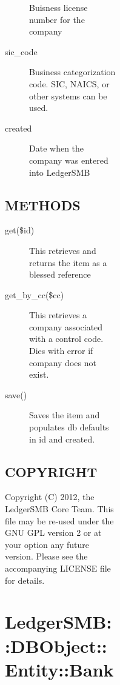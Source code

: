 \begin{description}
\begin{description}
\begin{description}
\begin{description}
\begin{description}
\begin{description}
\begin{description}
\begin{description}
\begin{description}
Buisness license number for the company


\item[{sic\_code}] \mbox{}

Business categorization code.  SIC, NAICS, or other systems can be used.


\item[{created}] \mbox{}

Date when the company was entered into LedgerSMB

\end{description}
\subsection*{METHODS\label{LedgerSMB::DBObject::Entity::Company_-_-_Company_business_handling_for_LedgerSMB_METHODS}}
\begin{description}

\item[{get(\$id)}] \mbox{}

This retrieves and returns the item as a blessed reference


\item[{get\_by\_cc(\$cc)}] \mbox{}

This retrieves a company associated with a control code.  Dies with error if 
company does not exist.


\item[{save()}] \mbox{}

Saves the item and populates db defaults in id and created.

\end{description}
\subsection*{COPYRIGHT\label{LedgerSMB::DBObject::Entity::Company_-_-_Company_business_handling_for_LedgerSMB_COPYRIGHT}}


Copyright (C) 2012, the LedgerSMB Core Team.  This file may be re-used under the GNU GPL
version 2 or at your option any future version.  Please see the accompanying LICENSE 
file for details.

\section{LedgerSMB::DBObject::Entity::Bank\label{LedgerSMB::DBObject::Entity::Bank}}



\end{description}
\end{description}
\end{description}
\end{description}
\end{description}
\end{description}
\end{description}
\end{description}

